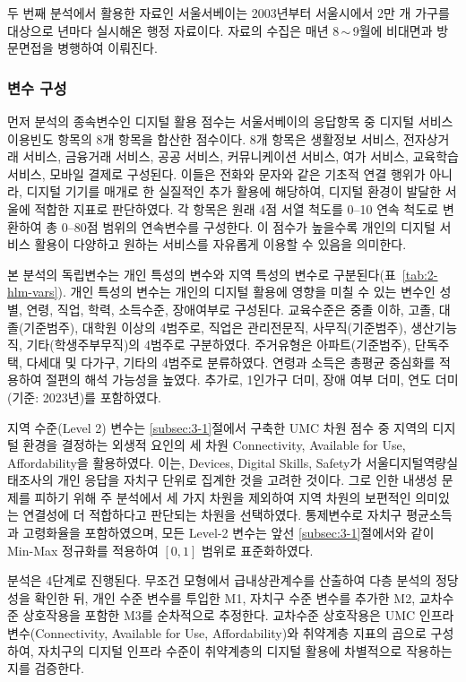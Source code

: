 두 번째 분석에서 활용한 자료인 서울서베이는 2003년부터 서울시에서 2만 개 가구를 대상으로 년마다 실시해온 행정 자료이다. 자료의 수집은 매년 8\,$\sim$\,9월에 비대면과 방문면접을 병행하여 이뤄진다.

\subsubsection{변수 구성}
\label{subsubsec:3-2-1}

먼저 분석의 종속변수인 디지털 활용 점수는 서울서베이의 응답항목 중 디지털 서비스 이용빈도 항목의 8개 항목을 합산한 점수이다. 8개 항목은 생활정보 서비스, 전자상거래 서비스, 금융거래 서비스, 공공 서비스, 커뮤니케이션 서비스, 여가 서비스, 교육학습 서비스, 모바일 결제로 구성된다. 이들은 전화와 문자와 같은 기초적 연결 행위가 아니라, 디지털 기기를 매개로 한 실질적인 추가 활용에 해당하여, 디지털 환경이 발달한 서울에 적합한 지표로 판단하였다. 각 항목은 원래 4점 서열 척도를 0--10 연속 척도로 변환하여 총 0--80점 범위의 연속변수를 구성한다. 이 점수가 높을수록 개인의 디지털 서비스 활용이 다양하고 원하는 서비스를 자유롭게 이용할 수 있음을 의미한다.

본 분석의 독립변수는 개인 특성의 변수와 지역 특성의 변수로 구분된다(표~\ref{tab:2-hlm-vars}). 개인 특성의 변수는 개인의 디지털 활용에 영향을 미칠 수 있는 변수인 성별, 연령, 직업, 학력, 소득수준, 장애여부로 구성된다. 교육수준은 중졸 이하, 고졸, 대졸(기준범주), 대학원 이상의 4범주로, 직업은 관리\textperiodcentered{}전문직, 사무직(기준범주), 생산\textperiodcentered{}기능직, 기타(학생\textperiodcentered{}주부\textperiodcentered{}무직)의 4범주로 구분하였다. 주거유형은 아파트(기준범주), 단독주택, 다세대 및 다가구, 기타의 4범주로 분류하였다. 연령과 소득은 총평균 중심화를 적용하여 절편의 해석 가능성을 높였다. 추가로, 1인가구 더미, 장애 여부 더미, 연도 더미(기준: 2023년)를 포함하였다.

지역 수준(Level 2) 변수는 \ref{subsec:3-1}절에서 구축한 UMC 차원 점수 중 지역의 디지털 환경을 결정하는 외생적 요인의 세 차원 Connectivity, Available for Use, Affordability을 활용하였다. 이는, Devices, Digital Skills, Safety가 서울디지털역량실태조사의 개인 응답을 자치구 단위로 집계한 것을 고려한 것이다. 그로 인한 내생성 문제를 피하기 위해 주 분석에서 세 가지 차원을 제외하여 지역 차원의 보편적인 의미있는 연결성에 더 적합하다고 판단되는 차원을 선택하였다. 통제변수로 자치구 평균소득과 고령화율을 포함하였으며, 모든 Level-2 변수는 앞선 \ref{subsec:3-1}절에서와 같이 Min-Max 정규화를 적용하여 $[0,1]$ 범위로 표준화하였다.

분석은 4단계로 진행된다. 무조건 모형에서 급내상관계수를 산출하여 다층 분석의 정당성을 확인한 뒤, 개인 수준 변수를 투입한 M1, 자치구 수준 변수를 추가한 M2, 교차수준 상호작용을 포함한 M3를 순차적으로 추정한다. 교차수준 상호작용은 UMC 인프라 변수(Connectivity, Available for Use, Affordability)와 취약계층 지표의 곱으로 구성하여, 자치구의 디지털 인프라 수준이 취약계층의 디지털 활용에 차별적으로 작용하는지를 검증한다.

